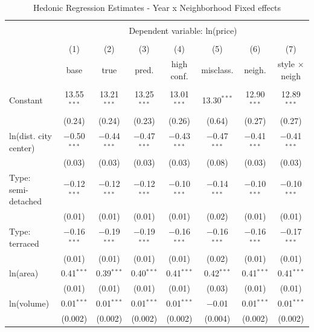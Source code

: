 \documentclass[]{article}
\begin{document}
\clearpage
\begin{table}[!htbp] \centering 
  \caption{Hedonic Regression Estimates - Year x Neighborhood Fixed effects} 
  \label{tab:hedreg_year_loc_int} 
\footnotesize 
\begin{tabular}{@{\extracolsep{5pt}}lccccccc} 
\\[-1.8ex]\hline 
\hline \\[-1.8ex] 
 & \multicolumn{7}{c}{Dependent variable: ln(price)} \\ 
\cline{2-8} 
\\[-1.8ex] & (1) & (2) & (3) & (4) & (5) & (6) & (7)\\ 
 & base & true & pred. & high conf. & misclass. & neigh. & style $\times$ neigh\\ 

\hline \\[-1.8ex] 
 Constant & 13.55$^{***}$ & 13.21$^{***}$ & 13.25$^{***}$ & 13.01$^{***}$ & 13.30$^{***}$ & 12.90$^{***}$ & 12.89$^{***}$ \\ 
  & (0.24) & (0.24) & (0.23) & (0.26) & (0.64) & (0.27) & (0.27) \\ 
  ln(dist. city center) & $-$0.50$^{***}$ & $-$0.44$^{***}$ & $-$0.47$^{***}$ & $-$0.43$^{***}$ & $-$0.47$^{***}$ & $-$0.41$^{***}$ & $-$0.41$^{***}$ \\ 
  & (0.03) & (0.03) & (0.03) & (0.03) & (0.08) & (0.03) & (0.03) \\ 
  Type: semi-detached & $-$0.12$^{***}$ & $-$0.12$^{***}$ & $-$0.12$^{***}$ & $-$0.10$^{***}$ & $-$0.14$^{***}$ & $-$0.10$^{***}$ & $-$0.10$^{***}$ \\ 
  & (0.01) & (0.01) & (0.01) & (0.01) & (0.02) & (0.01) & (0.01) \\ 
  Type: terraced & $-$0.16$^{***}$ & $-$0.19$^{***}$ & $-$0.19$^{***}$ & $-$0.16$^{***}$ & $-$0.16$^{***}$ & $-$0.16$^{***}$ & $-$0.17$^{***}$ \\ 
  & (0.01) & (0.01) & (0.01) & (0.01) & (0.02) & (0.01) & (0.01) \\ 
  ln(area) & 0.41$^{***}$ & 0.39$^{***}$ & 0.40$^{***}$ & 0.41$^{***}$ & 0.42$^{***}$ & 0.41$^{***}$ & 0.41$^{***}$ \\ 
  & (0.01) & (0.01) & (0.01) & (0.01) & (0.03) & (0.01) & (0.01) \\ 
  ln(volume) & 0.01$^{***}$ & 0.01$^{***}$ & 0.01$^{***}$ & 0.01$^{***}$ & $-$0.01 & 0.01$^{***}$ & 0.01$^{***}$ \\ 
  & (0.002) & (0.002) & (0.002) & (0.002) & (0.004) & (0.002) & (0.002) \\ 

\end{tabular}
\end{table}
\end{document}
